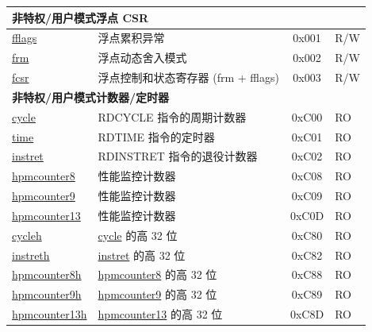 \begin{longtable}{ | p{4.0cm} | p{8.4cm} | c | l | }
\multicolumn{4}{|l|}{\textbf{非特权/用户模式浮点 CSR}} \\\hline
\hyperref[regdesc:FFLAGS]{fflags} & 浮点累积异常 & 0x001 & R/W \\\hline
\hyperref[regdesc:FRM]{frm} & 浮点动态舍入模式 & 0x002 & R/W \\\hline
\hyperref[regdesc:FCSR]{fcsr} & 浮点控制和状态寄存器 (frm + fflags) & 0x003 & R/W \\\hline

\multicolumn{4}{|l|}{\textbf{非特权/用户模式计数器/定时器}} \\\hline
\hyperref[regdesc:CYCLE]{cycle} & RDCYCLE 指令的周期计数器 & 0xC00 & RO\\\hline
\hyperref[regdesc:TIME]{time} & RDTIME 指令的定时器 & 0xC01 & RO \\\hline
\hyperref[regdesc:INSTRET]{instret} & RDINSTRET 指令的退役计数器 & 0xC02 & RO \\\hline
\hyperref[regdesc:HPMCOUNTER8]{hpmcounter8} & 性能监控计数器 & 0xC08 & RO \\\hline
\hyperref[regdesc:HPMCOUNTER9]{hpmcounter9} & 性能监控计数器 & 0xC09 & RO \\\hline
\hyperref[regdesc:HPMCOUNTER13]{hpmcounter13} & 性能监控计数器 & 0xC0D & RO \\\hline
\hyperref[regdesc:CYCLEH]{cycleh} & \hyperref[regdesc:CYCLE]{cycle} 的高 32 位 & 0xC80 & RO \\\hline
\hyperref[regdesc:INSTRETH]{instreth} & \hyperref[regdesc:INSTRET]{instret} 的高 32 位 & 0xC82 & RO \\\hline
\hyperref[regdesc:HPMCOUNTER8H]{hpmcounter8h} & \hyperref[regdesc:HPMCOUNTER8]{hpmcounter8} 的高 32 位 & 0xC88 & RO \\\hline
\hyperref[regdesc:HPMCOUNTER9H]{hpmcounter9h} & \hyperref[regdesc:HPMCOUNTER9]{hpmcounter9} 的高 32 位 & 0xC89 & RO \\\hline
\hyperref[regdesc:HPMCOUNTER13H]{hpmcounter13h} & \hyperref[regdesc:HPMCOUNTER13]{hpmcounter13} 的高 32 位 & 0xC8D & RO \\\hline


\end{longtable}
